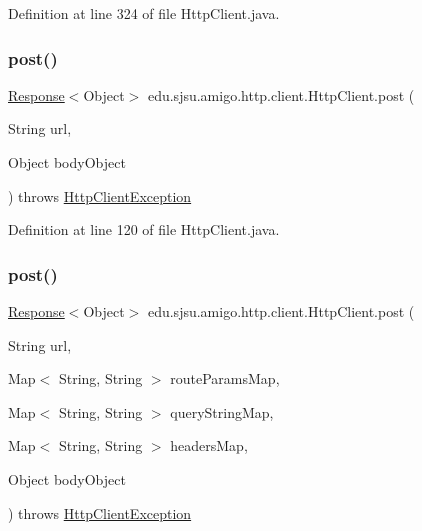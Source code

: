 Definition at line 324 of file Http\+Client.\+java.

\mbox{\label{classedu_1_1sjsu_1_1amigo_1_1http_1_1client_1_1_http_client_a0bfbdc02d793db5d3a85c9067533d47d}} 
\subsubsection{\texorpdfstring{post()}{post()}\hspace{0.1cm}{\footnotesize\ttfamily [1/2]}}
{\footnotesize\ttfamily \hyperlink{classedu_1_1sjsu_1_1amigo_1_1http_1_1client_1_1_response}{Response}$<$Object$>$ edu.\+sjsu.\+amigo.\+http.\+client.\+Http\+Client.\+post (\begin{DoxyParamCaption}\item[{String}]{url,  }\item[{Object}]{body\+Object }\end{DoxyParamCaption}) throws \hyperlink{classedu_1_1sjsu_1_1amigo_1_1http_1_1client_1_1_http_client_exception}{Http\+Client\+Exception}}



Definition at line 120 of file Http\+Client.\+java.

\mbox{\label{classedu_1_1sjsu_1_1amigo_1_1http_1_1client_1_1_http_client_a142b3fd468c2408083dade16b705dcd1}} 
\subsubsection{\texorpdfstring{post()}{post()}\hspace{0.1cm}{\footnotesize\ttfamily [2/2]}}
{\footnotesize\ttfamily \hyperlink{classedu_1_1sjsu_1_1amigo_1_1http_1_1client_1_1_response}{Response}$<$Object$>$ edu.\+sjsu.\+amigo.\+http.\+client.\+Http\+Client.\+post (\begin{DoxyParamCaption}\item[{String}]{url,  }\item[{Map$<$ String, String $>$}]{route\+Params\+Map,  }\item[{Map$<$ String, String $>$}]{query\+String\+Map,  }\item[{Map$<$ String, String $>$}]{headers\+Map,  }\item[{Object}]{body\+Object }\end{DoxyParamCaption}) throws \hyperlink{classedu_1_1sjsu_1_1amigo_1_1http_1_1client_1_1_http_client_exception}{Http\+Client\+Exception}}



